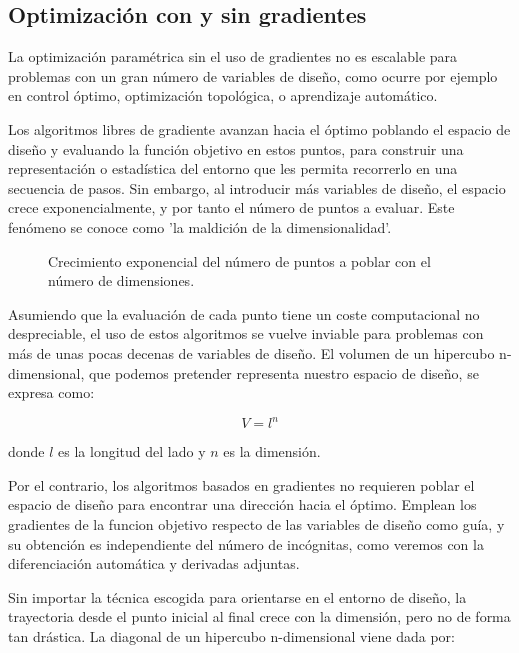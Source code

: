 \subsection{Optimización con y sin gradientes}

La optimización paramétrica sin el uso de gradientes no es escalable para
problemas con un gran número de variables de diseño, como ocurre por ejemplo en
control óptimo, optimización topológica, o aprendizaje automático.

Los algoritmos libres de gradiente avanzan hacia el óptimo poblando el espacio
de diseño y evaluando la función objetivo en estos puntos, para construir una
representación o estadística del entorno que les permita recorrerlo en una
secuencia de pasos. Sin embargo, al introducir más variables de diseño, el
espacio crece exponencialmente, y por tanto el número de puntos a evaluar. Este
fenómeno se conoce como 'la maldición de la dimensionalidad'.

\begin{figure}[h] \centering
	\centering
	
	\caption{Crecimiento exponencial del número de puntos a poblar con el número de dimensiones.}
	\label{fig:hypercube}
\end{figure}

Asumiendo que la evaluación de cada punto tiene un coste computacional no
despreciable, el uso de estos algoritmos se vuelve inviable para problemas con
más de unas pocas decenas de variables de diseño. El volumen de un hipercubo
n-dimensional, que podemos pretender representa nuestro espacio de diseño,
se expresa como:

\begin{equation}
	V = l^n
\end{equation}

donde $l$ es la longitud del lado y $n$ es la dimensión.

Por el contrario, los algoritmos basados en gradientes no requieren poblar el
espacio de diseño para encontrar una dirección hacia el óptimo. Emplean los
gradientes de la funcion objetivo respecto de las variables de diseño como
guía, y su obtención es independiente del número de incógnitas, como veremos
con la diferenciación automática y derivadas adjuntas.

Sin importar la técnica escogida para orientarse en el entorno de diseño, la
trayectoria desde el punto inicial al final crece con la dimensión, pero no de
forma tan drástica. La diagonal de un hipercubo n-dimensional viene dada por:

